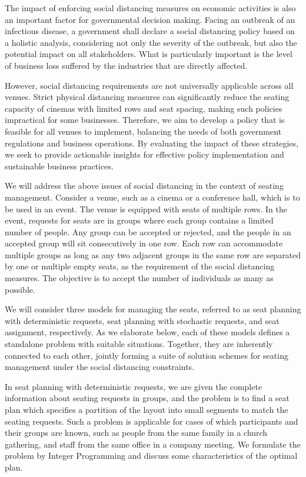 The impact of enforcing social distancing measures on economic activities is also an important factor for governmental decision making. Facing an outbreak of an infectious disease, a government shall declare a social distancing policy based on a holistic analysis, considering not only the severity of the outbreak, but also the potential impact on all stakeholders. What is particularly important is the level of business loss suffered by the industries that are directly affected.  

However, social distancing requirements are not universally applicable across all venues. Strict physical distancing measures can significantly reduce the seating capacity of cinemas with limited rows and seat spacing, making such policies impractical for some businesses. Therefore, we aim to develop a policy that is feasible for all venues to implement, balancing the needs of both government regulations and business operations. By evaluating the impact of these strategies, we seek to provide actionable insights for effective policy implementation and sustainable business practices.


We will address the above issues of social distancing in the context of seating management. Consider a venue, such as a cinema or a conference hall, which is to be used in an event. The venue is equipped with seats of multiple rows. In the event, requests for seats are in groups where each group contains a limited number of people. Any group can be accepted or rejected, and the people in an accepted group  will sit consecutively in one row. Each row can accommodate multiple groups as long as any two adjacent groups in the same row are separated by one or multiple empty seats, as the requirement of the social distancing measures. The objective is to accept the number of individuals as many as possible.

We will consider three models for managing the seats, referred to as seat planning with deterministic requests, seat planning with stochastic requests, and seat assignment, respectively. As we elaborate below, each of these models defines a standalone problem with suitable situations. Together, they are inherently connected to each other, jointly forming a suite of solution schemes for seating management under the social distancing constraints.

In seat planning with deterministic requests, we are given the complete information about seating requests in groups, and the problem is to find a seat plan which specifies a partition of the layout into small segments to match the seating requests. Such a problem is applicable for cases of which participants and their groups are known, such as people from the same family in a church gathering, and staff from the same office in a company meeting. We formulate the problem by Integer Programming and discuss some characteristics of the optimal plan.
 
